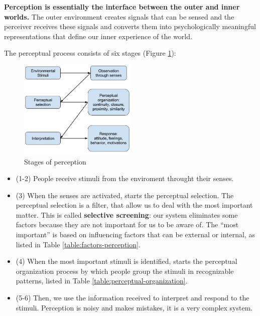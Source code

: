 \documentclass[12pt,article,oneside,a4paper]{memoir}
\begin{document}
\textbf{Perception is essentially the interface between the outer and inner worlds.} The outer environment creates signals that can be sensed and the perceiver receives these signals and converts them into psychologically meaningful representations that define our inner experience of the world.

The perceptual process consists of six stages (Figure \ref{fig:perception-stages}):

\begin{figure}
  \centering
  \includegraphics[width=0.5\textwidth]{imgs/perception-stages.png}
  \caption{Stages of perception}
  \label{fig:perception-stages}
\end{figure}

\begin{itemize}
\item (1-2) People receive stimuli from the enviroment throught their senses.
\item (3) When the senses are activated, starts the perceptual selection. The perceptual selection is a filter, that allow us to deal with the most important matter. This is called \textbf{selective screening}: our system eliminates some factors because they are not important for us to be aware of. The ``most important'' is based on influencing factors that can be external or internal, as listed in Table \ref{table:factors-perception}.
\item (4) When the most important stimuli is identified, starts the perceptual organization process by which people group the stimuli in recognizable patterns, listed in Table  \ref{table:perceptual-organization}.
\item (5-6) Then, we use the information received to interpret and respond to the stimuli. Perception is noisy and makes mistakes, it is a very complex system.
\end{itemize}
\end{document}
